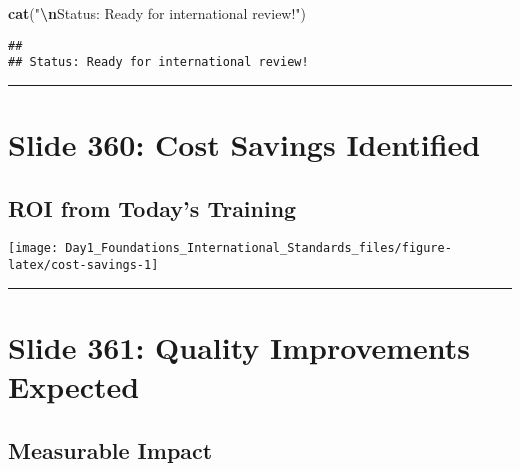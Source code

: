 \documentclass[
]{article}
\newenvironment{Shaded}{\begin{snugshade}}{\end{snugshade}}
\newcommand{\FunctionTok}[1]{\textcolor[rgb]{0.13,0.29,0.53}{\textbf{#1}}}
\newcommand{\NormalTok}[1]{#1}
\newcommand{\SpecialCharTok}[1]{\textcolor[rgb]{0.81,0.36,0.00}{\textbf{#1}}}
\newcommand{\StringTok}[1]{\textcolor[rgb]{0.31,0.60,0.02}{#1}}
\begin{document}
\begin{Shaded}
\begin{Highlighting}[]
\FunctionTok{cat}\NormalTok{(}\StringTok{"}\SpecialCharTok{\textbackslash{}n}\StringTok{Status: Ready for international review!"}\NormalTok{)}
\end{Highlighting}
\end{Shaded}

\begin{verbatim}
## 
## Status: Ready for international review!
\end{verbatim}

\begin{center}\rule{0.5\linewidth}{0.5pt}\end{center}

\section{Slide 360: Cost Savings
Identified}\label{slide-360-cost-savings-identified}

\subsection{ROI from Today's Training}\label{roi-from-todays-training}

\texttt{[image: Day1\_Foundations\_International\_Standards\_files/figure-latex/cost-savings-1]}

\begin{center}\rule{0.5\linewidth}{0.5pt}\end{center}

\section{Slide 361: Quality Improvements
Expected}\label{slide-361-quality-improvements-expected}

\subsection{Measurable Impact}\label{measurable-impact}
\end{document}
